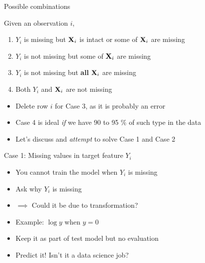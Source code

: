 \documentclass[ignorenonframetext,]{beamer}
\providecommand{\tightlist}{%
  \setlength{\itemsep}{0pt}\setlength{\parskip}{0pt}}
\begin{document}
\begin{frame}{Possible combinations}

Given an observation \(i\),

\begin{enumerate}[<+->]
\def\labelenumi{\arabic{enumi}.}
\tightlist
\item
  \(Y_{i}\) is missing but \(\bold{X}_{i}\) is intact or some of
  \(\bold{X}_{i}\) are missing
\item
  \(Y_{i}\) is not missing but some of \(\bold{X}_{i}\) are missing
\item
  \(Y_{i}\) is not missing but \textbf{all} \(\bold{X}_{i}\) are missing
\item
  Both \(Y_{i}\) and \(\bold{X}_{i}\) are not missing
\end{enumerate}

\begin{itemize}[<+->]
\tightlist
\item
  Delete row \(i\) for Case 3, as it is probably an error
\item
  Case 4 is ideal \emph{if} we have 90 to 95 \% of such type in the data
\item
  Let's discuss and \emph{attempt} to solve Case 1 and Case 2
\end{itemize}

\end{frame}

\begin{frame}{Case 1: Missing values in target feature \(Y_{i}\)}

\begin{itemize}[<+->]
\tightlist
\item
  You cannot train the model when \(Y_{i}\) is missing
\item
  Ask why \(Y_{i}\) is missing
\item
  \(\implies\) Could it be due to transformation?
\item
  Example: \(\log{y}\) when \(y=0\)
\item
  Keep it as part of test model but no evaluation
\item
  Predict it! Isn't it a data science job?
\end{itemize}

\end{frame}
\end{document}
